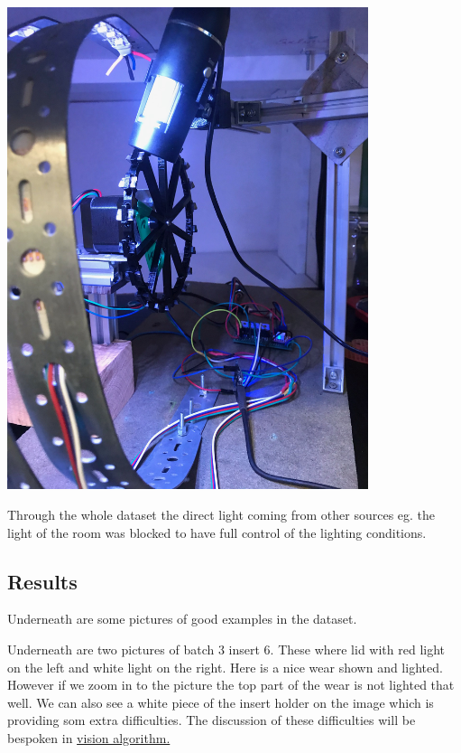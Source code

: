 \documentclass{scrartcl}
\begin{document}
\includegraphics[width=4.166667in, keepaspectratio=true]{./2_Spaghetti_dataset/IMG_9296.jpeg}



Through the whole dataset the direct light coming from other sources eg. the light of the room was blocked to have full control of the lighting conditions.



\subsection{Results}

Underneath are some pictures of good examples in the dataset.



Underneath are two pictures of batch 3 insert 6. These where lid with red light on the left and white light on the right. Here is a nice wear shown and lighted. However if we zoom in to the picture the top part of the wear is not lighted that well. We can also see a white piece of the insert holder on the image which is providing som extra difficulties. The discussion of these difficulties will be bespoken in \href{../../../../Research/Vision_Algorithm.tex}{vision algorithm.}
\end{document}

